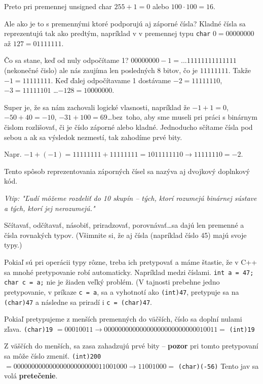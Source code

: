 Preto pri premennej unsigned char $255+1 = 0$ alebo $100\cdot 100 = 16$.

\medskip

Ale ako je to s premennými ktoré podporujú aj záporné čísla?  Kladné čísla sa
reprezentujú tak ako predtým, napríklad v v premennej typu \verb!char! $0 =
00000000$ až $127 = 01111111$.

Čo sa stane, keď od nuly odpočítame 1? $00000000 - 1 = ...11111111111111$
(nekonečné čislo) ale nás zaujíma len posledných 8 bitov, čo je $11111111$.
Takže $-1 = 11111111$. Keď ďalej odpočítavame 1 dostávame $-2 = 11111110$, $-3
= 11111101$ \dots $-128 = 10000000$. 

Super je, že sa nám zachovali logické vlasnosti, napríklad že $-1 + 1 = 0$,
$-50 + 40 = -10$, $-31 + 100 = 69$\dots bez~toho, aby sme museli pri práci s
binárnym čislom rozlišovať, či je číslo záporné alebo kladné.  Jednoducho
sčítame čísla pod sebou a ak sa výsledok nezmestí, tak zahodíme prvé bity.

Napr. $-1 + (-1) = 11111111 + 11111111 = 1011111110 \rightarrow 11111110 = -2$.

Tento spôsob reprezentovania záporných čísel sa nazýva aj dvojkový doplnkový
kód.

\textit{Vtip: "Ľudí môžeme rozdeliť do 10 skupín -- tých, ktorí rozumejú
binárnej sústave a tých, ktorí jej nerozumejú."}


Sčítavať, odčítavať, násobiť, priradzovať, porovnávať\dots sa dajú len premenné
a čísla rovnakých typov.  (Všimnite si, že aj čísla (napríklad číslo 45) majú
svoje typy.)

Pokiaľ sú pri operácii typy rôzne, treba ich pretypovať a máme štastie, že v
C++ sa mnohé pretypovanie robí automaticky. Napríklad medzi číslami.  
\verb!int a = 47; char c = a;! nie je žiaden veľký problém.  (V tajnosti
prebehne jedno pretypovanie, v príkaze \verb!c = a!, sa a vyhotnotí ako
\verb!(int)47!, pretypuje sa na \verb!(char)47! a následne sa priradí i
\verb!c = (char)47!.

Pokiaľ pretypujeme z menších premenných do väčších, číslo sa doplní nulami
zľava.  \verb!(char)19! $= 00010011 \rightarrow 00000000 00000000 00000000
00010011 =$ \verb!(int)19!

Z väščích do menších, sa zasa zahadzujú prvé bity -- \textbf{pozor} pri tomto
pretypovaní sa môže číslo zmeniť.  \verb!(int)200! $= 00000000 00000000
00000000 11001000 \rightarrow 11001000 =$ \verb!(char)(-56)!  Tento jav sa volá
\textbf{pretečenie}.

